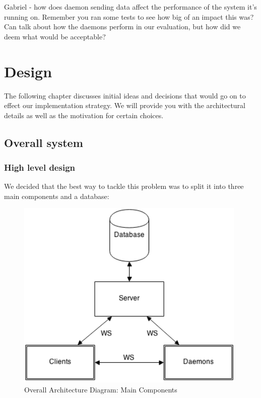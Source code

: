 \documentclass{l3proj}
\begin{document}
Gabriel - how does daemon sending data affect the performance of the system it's running on. Remember you ran some tests to see how big of an impact this was? Can talk about how the daemons perform in our evaluation, but how did we deem what would be acceptable?



\chapter{Design}
\label{design}

The following chapter discusses initial ideas and decisions that would go on to effect our implementation strategy. We will provide you with the architectural details as well as the motivation for certain choices.


\section{Overall system}

\subsection{High level design}

We decided that the best way to tackle this problem was to split it into three main components and a database:

\begin{figure}[H]
\centering
\includegraphics[width=110mm]{images/ArchitectureDiagram.png}
\caption{Overall Architecture Diagram: Main Components}
\end{figure}
\end{document}
